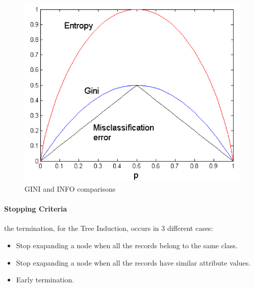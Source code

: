 \documentclass[12pt]{article}
\begin{document}
\begin{figure}[H]
  \includegraphics[width=\linewidth]{images/gini-info.png}
  \caption{GINI and INFO comparisons}
  \label{fig:gini-info}
\end{figure}

\paragraph{Stopping Criteria} the termination, for the Tree Induction, occurs in 3 different cases:
\begin{itemize}
  \item Stop exapanding a node when all the records belong to the same class.
  \item Stop exapanding a node when all the records have similar attribute values.
  \item Early termination.
\end{itemize}
\end{document}
